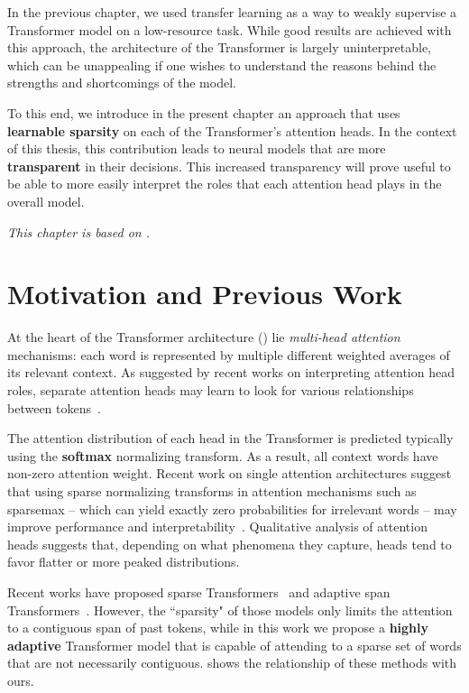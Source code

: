 \label{cap:adaptsparse}

In the previous chapter, we used transfer learning as a way
to weakly supervise a Transformer model on a low-resource task.
While good results are achieved with this approach, the
architecture of the Transformer is largely uninterpretable,
which can be unappealing if one wishes to understand the
reasons behind the strengths and shortcomings of the model.

To this end, we introduce in the present chapter an
approach that uses \textbf{learnable sparsity} on each
of the Transformer's attention heads. In the context
of this thesis, this contribution leads to neural models
that are more \textbf{transparent} in their decisions.
This increased transparency will prove useful to be able to
more easily interpret the roles that each attention head
plays in the overall model.

\textit{This chapter is based on \citet{correia2019adaptively}.}

\section{Motivation and Previous Work}

At the heart of the Transformer architecture
() lie \emph{multi-head attention}
mechanisms: each word is represented by multiple different weighted
averages of its relevant context. As suggested by recent works on
interpreting attention head roles, separate attention heads may learn
to look for various relationships between
tokens~\citep{tang2018why,raganato2018analysis,
    marecek-rosa-2018-extracting,bert-rediscovers,specialized}.

The attention distribution of each head in the Transformer is
predicted typically using the \textbf{softmax} normalizing transform.
As a result, all context words have non-zero attention weight. Recent
work on single attention architectures suggest that using sparse
normalizing transforms in attention mechanisms such as sparsemax --
which can yield exactly zero probabilities for irrelevant words --
may improve performance and
interpretability~\citep{malaviya2018sparse,deng2018latent,entmax}.
Qualitative analysis of attention heads
\citep[Figure~5]{vaswani2017attention} suggests that, depending on
what phenomena they capture, heads tend to favor flatter or more
peaked distributions.

\begin{sloppypar}
    Recent works have proposed sparse
    Transformers~\citep{openai_sparse_transf} and adaptive span
    Transformers~\citep{Sukhbaatar2019}. However, the ``sparsity" of those
    models only limits the attention to a contiguous span of past tokens,
    while in this work we propose a \textbf{highly adaptive} Transformer
    model that is capable of attending to a sparse set of words that are
    not necessarily contiguous.  shows the
    relationship of these methods with ours.
\end{sloppypar}

